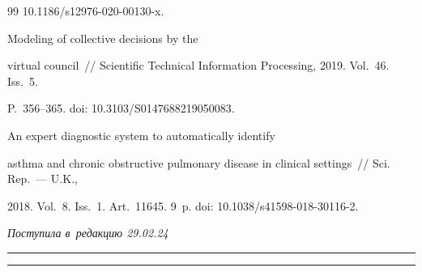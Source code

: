 {{\begin{thebibliography}{99}
10.1186\!/\!s12976-020-00130-x.


 Modeling of collective decisions by the 

virtual council~/\!\!/ Scientific Technical Information Processing, 2019. Vol.~46. Iss.~5.  

P.~356--365. doi: 10.3103\!/\!S0147688219050083.


 An expert diagnostic system to automatically identify 

asthma and chronic obstructive pulmonary disease in clinical settings~/\!\!/ Sci. Rep.~--- U.K., 

2018. Vol.~8. Iss.~1. Art.~11645. 9~p. doi: 10.1038\!/\!s41598-018-\mbox{30116-2}.

   

        \end{thebibliography}

} }







\vspace*{-6pt}



\hfill{\small\textit{Поступила в~редакцию 29.02.24}}



\vspace*{8pt}



\hrule



\vspace*{2pt}





\hrule



\vspace*{8pt}









\def\tit{INTELLIGENT DECISION SUPPORT SYSTEMS IN~MEDICINE: CONCEPT, 

PROBLEMS, AND~APPROACHES TO~THE~DEVELOPMENT\\[-5pt]}







